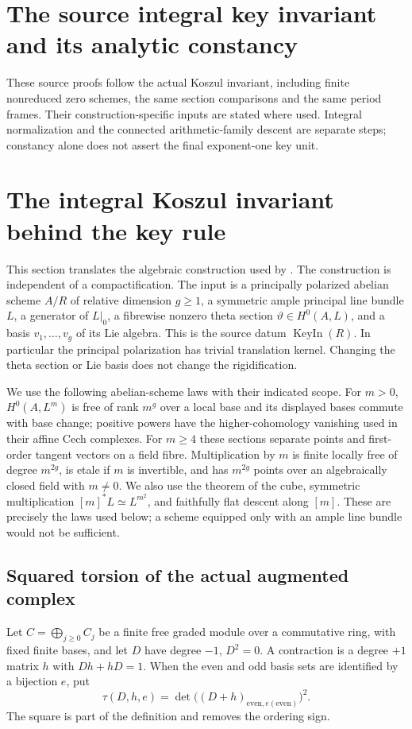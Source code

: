 \section{The source integral key invariant and its analytic constancy}
\label{sec:faithful-theta-key-source}
These source proofs follow the actual Koszul invariant, including
finite nonreduced zero schemes, the same section comparisons and
the same period frames. Their construction-specific inputs are
stated where used. Integral normalization and the connected
arithmetic-family descent are separate steps; constancy alone
does not assert the final exponent-one key unit.


\section{The integral Koszul invariant behind the key rule}
\label{sec:ftb-koszul-key}
This section translates the algebraic construction used by
.
The construction is independent of a compactification.
The input is a principally polarized abelian scheme \(A/R\) of
relative dimension \(g\geq1\), a symmetric ample principal line bundle
\(L\), a generator of \(L|_0\), a fibrewise nonzero theta section
\(\vartheta\in H^0(A,L)\), and a basis \(v_1,\ldots,v_g\) of its Lie
algebra.  This is the source datum \(\operatorname{KeyIn}(R)\).
In particular the principal polarization has trivial translation
kernel.  Changing the theta section or Lie basis does not change the
rigidification.

We use the following abelian-scheme laws with their indicated scope.
For \(m>0\), \(H^0(A,L^m)\) is free of rank \(m^g\) over a local base
and its displayed bases commute with base change; positive powers have
the higher-cohomology vanishing used in their affine Cech complexes.
For \(m\geq4\) these sections separate points and first-order tangent
vectors on a field fibre.  Multiplication by \(m\) is finite locally
free of degree \(m^{2g}\), is etale if \(m\) is invertible, and has
\(m^{2g}\) points over an algebraically closed field with \(m\ne0\).
We also use the theorem of the cube, symmetric multiplication
\([m]^*L\simeq L^{m^2}\), and faithfully flat descent along \([m]\).
These are precisely the laws used below; a scheme equipped only with
an ample line bundle would not be sufficient.

\subsection{Squared torsion of the actual augmented complex}
Let \(C=\bigoplus_{j\geq0}C_j\) be a finite free graded module over a
commutative ring, with fixed finite bases, and let \(D\) have degree
\(-1\), \(D^2=0\).
A contraction is a degree \(+1\) matrix \(h\) with \(Dh+hD=1\).
When the even and odd basis sets are identified by a bijection \(e\),
put
\[
 \tau(D,h,e)
  =\det\bigl((D+h)_{\mathrm{even},e(\mathrm{even})}\bigr)^2.
 \tag{K1}\label{eq:ftb-torsion-square}
\]
The square is part of the definition and removes the ordering sign.

